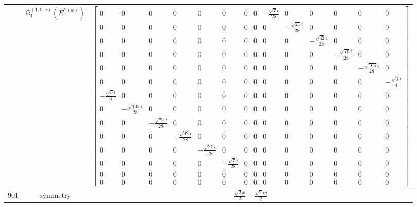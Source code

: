 \documentclass[fleqn,8pt,landscape]{jsarticle}
\begin{document}
\begin{longtable}{ccc}
$  $ & $ \mathbb{G}_{1}^{(1,0;a)}(E^{\prime\prime(a)}) $ & $ \begin{bmatrix} 0 & 0 & 0 & 0 & 0 & 0 & 0 & 0 & - \frac{\sqrt{7} i}{28} & 0 & 0 & 0 & 0 & 0 \\ 0 & 0 & 0 & 0 & 0 & 0 & 0 & 0 & 0 & - \frac{\sqrt{21} i}{28} & 0 & 0 & 0 & 0 \\ 0 & 0 & 0 & 0 & 0 & 0 & 0 & 0 & 0 & 0 & - \frac{\sqrt{42} i}{28} & 0 & 0 & 0 \\ 0 & 0 & 0 & 0 & 0 & 0 & 0 & 0 & 0 & 0 & 0 & - \frac{\sqrt{70} i}{28} & 0 & 0 \\ 0 & 0 & 0 & 0 & 0 & 0 & 0 & 0 & 0 & 0 & 0 & 0 & - \frac{\sqrt{105} i}{28} & 0 \\ 0 & 0 & 0 & 0 & 0 & 0 & 0 & 0 & 0 & 0 & 0 & 0 & 0 & - \frac{\sqrt{3} i}{4} \\ - \frac{\sqrt{3} i}{4} & 0 & 0 & 0 & 0 & 0 & 0 & 0 & 0 & 0 & 0 & 0 & 0 & 0 \\ 0 & - \frac{\sqrt{105} i}{28} & 0 & 0 & 0 & 0 & 0 & 0 & 0 & 0 & 0 & 0 & 0 & 0 \\ 0 & 0 & - \frac{\sqrt{70} i}{28} & 0 & 0 & 0 & 0 & 0 & 0 & 0 & 0 & 0 & 0 & 0 \\ 0 & 0 & 0 & - \frac{\sqrt{42} i}{28} & 0 & 0 & 0 & 0 & 0 & 0 & 0 & 0 & 0 & 0 \\ 0 & 0 & 0 & 0 & - \frac{\sqrt{21} i}{28} & 0 & 0 & 0 & 0 & 0 & 0 & 0 & 0 & 0 \\ 0 & 0 & 0 & 0 & 0 & - \frac{\sqrt{7} i}{28} & 0 & 0 & 0 & 0 & 0 & 0 & 0 & 0 \\ 0 & 0 & 0 & 0 & 0 & 0 & 0 & 0 & 0 & 0 & 0 & 0 & 0 & 0 \\ 0 & 0 & 0 & 0 & 0 & 0 & 0 & 0 & 0 & 0 & 0 & 0 & 0 & 0 \end{bmatrix} $ \\ \hline
$ 901 $ & $ \text{symmetry} $ & $ \frac{\sqrt{2} x}{2} - \frac{\sqrt{2} i y}{2} $ \\

\end{longtable}
\end{document}

